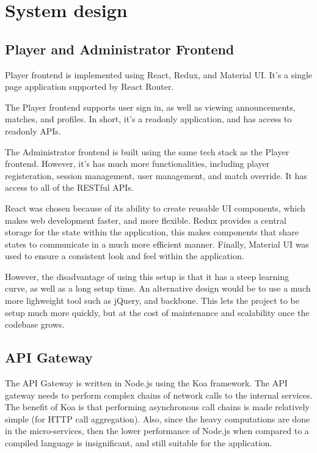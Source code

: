 \documentclass{article}
\begin{document}
\newpage


\section{System design}

\subsection{Player and Administrator Frontend}
Player frontend is implemented using React, Redux, and Material UI. It's a single page application supported by React Router.

The Player frontend supports user sign in, as well as viewing announcements, matches, and profiles. In short, it's a readonly application, and has access to readonly APIs.

The Administrator frontend is built using the same tech stack as the Player frontend. However, it's has much more functionalities, including player registeration, session management, user management, and match override. It has access to all of the RESTful APIs.

React was chosen because of its ability to create reusable UI components, which makes web development faster, and more flexible. Redux provides a central storage for the state within the application, this makes components that share states to communicate in a much more efficient manner. Finally, Material UI was used to ensure a consistent look and feel within the application.

However, the disadvantage of using this setup is that it has a steep learning curve, as well as a long setup time. An alternative design would be to use a much more lighweight tool such as jQuery, and backbone. This lets the project to be setup much more quickly, but at the cost of maintenance and scalability once the codebase grows.

\subsection{API Gateway}
The API Gateway is written in Node.js using the Koa framework. The API gateway needs to perform complex chains of network calls to the internal services. The benefit of Koa is that performing asynchronous call chains is made relatively simple (for HTTP call aggregation). Also, since the heavy computations are done in the micro-services, then the lower performance of Node.js when compared to a compiled language is insignificant, and still suitable for the application.
\end{document}
